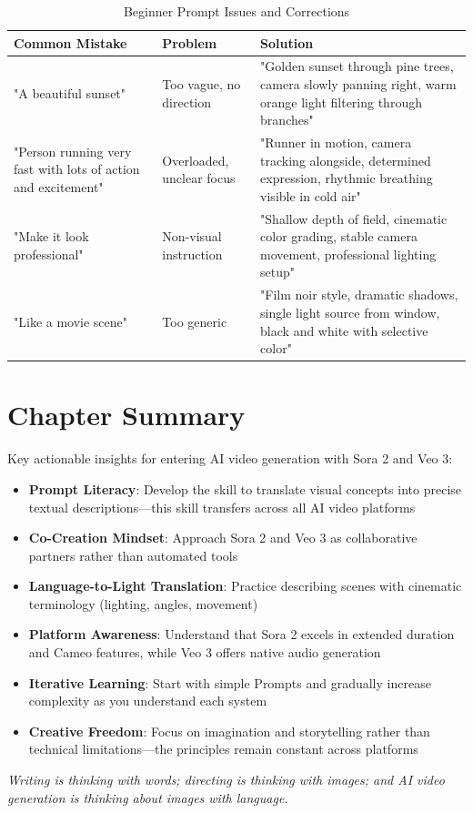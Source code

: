 \begin{table}[H]
\centering
\caption{Beginner Prompt Issues and Corrections \\ \authorillustration}
\label{tab:beginner-mistakes}
\begin{tabular}{p{4cm}p{4cm}p{5cm}}
\hline
\textbf{Common Mistake} & \textbf{Problem} & \textbf{Solution} \\
\hline
"A beautiful sunset" & Too vague, no direction & "Golden sunset through pine trees, camera slowly panning right, warm orange light filtering through branches" \\
\hline
"Person running very fast with lots of action and excitement" & Overloaded, unclear focus & "Runner in motion, camera tracking alongside, determined expression, rhythmic breathing visible in cold air" \\
\hline
"Make it look professional" & Non-visual instruction & "Shallow depth of field, cinematic color grading, stable camera movement, professional lighting setup" \\
\hline
"Like a movie scene" & Too generic & "Film noir style, dramatic shadows, single light source from window, black and white with selective color" \\
\hline
\end{tabular}
\end{table}

\section*{Chapter Summary}

Key actionable insights for entering AI video generation with Sora 2 and Veo 3:

\begin{itemize}
\item \textbf{Prompt Literacy}: Develop the skill to translate visual concepts into precise textual descriptions---this skill transfers across all AI video platforms
\item \textbf{Co-Creation Mindset}: Approach Sora 2 and Veo 3 as collaborative partners rather than automated tools
\item \textbf{Language-to-Light Translation}: Practice describing scenes with cinematic terminology (lighting, angles, movement)
\item \textbf{Platform Awareness}: Understand that Sora 2 excels in extended duration and Cameo features, while Veo 3 offers native audio generation
\item \textbf{Iterative Learning}: Start with simple Prompts and gradually increase complexity as you understand each system
\item \textbf{Creative Freedom}: Focus on imagination and storytelling rather than technical limitations---the principles remain constant across platforms
\end{itemize}

\begin{Prompt}
\textit{Writing is thinking with words; directing is thinking with images; and AI video generation is thinking about images with language.}
\end{Prompt}
